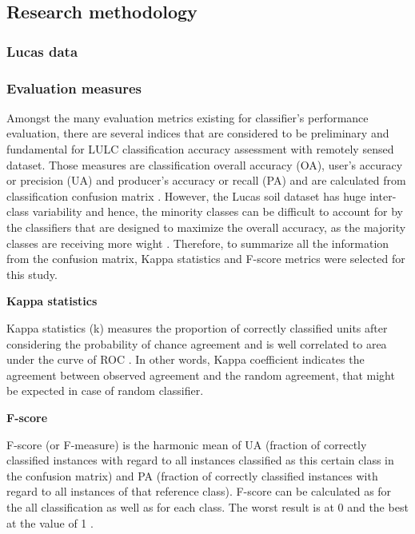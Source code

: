 \documentclass[parskip=full]{scrartcl}
\begin{document}
\subsection{Research methodology}

\subsubsection{Lucas data}


\subsubsection{Evaluation measures}
Amongst the many evaluation metrics existing for classifier's performance evaluation, 
there are several indices that are considered to be preliminary and fundamental for 
LULC classification accuracy assessment with remotely sensed dataset. Those measures 
are classification overall accuracy (OA), user's accuracy or precision (UA) and 
producer's accuracy or recall (PA) and are calculated from classification confusion 
matrix \cite{Liu2007}. However, the Lucas soil dataset has huge inter-class 
variability and hence, the minority classes can be difficult to account for by the 
classifiers that are designed to maximize the overall accuracy, as the majority 
classes are receiving more wight \cite{Inglada2017}. Therefore, to summarize all 
the information from the confusion matrix, Kappa statistics and F-score metrics were 
selected for this study. 

\textbf{Kappa statistics}

Kappa statistics (k) measures the proportion of correctly classified units after 
considering the probability of chance agreement and is well correlated to area 
under the curve of ROC \cite{Freeman2012}. In other words, Kappa coefficient indicates 
the agreement between observed agreement and the random agreement, that might be 
expected in case of random classifier.

\textbf{F-score}

F-score (or F-measure) is the harmonic mean of UA (fraction of correctly classified 
instances with regard to all instances classified as this certain class in the 
confusion matrix) and PA (fraction of correctly classified instances with regard 
to all instances of that reference class). F-score can be calculated as for the all 
classification as well as for each class. The worst result is at 0 and the best at 
the value of 1 \cite{Inglada2017}.





\end{document}
